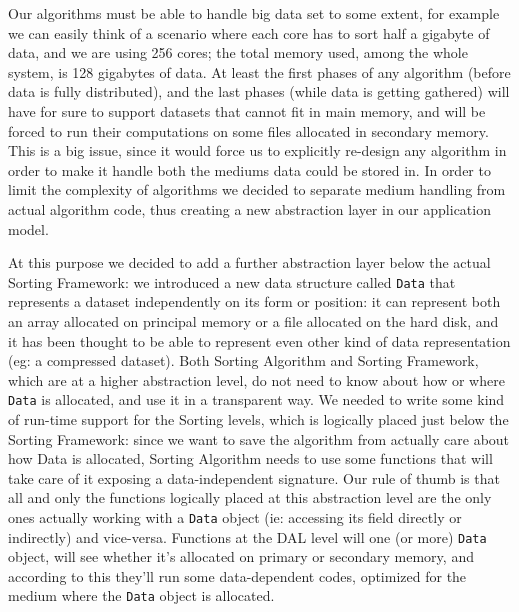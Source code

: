 \label{DAL}
Our algorithms must be able to handle big data set to some extent, for example we can easily think of a scenario where each core has to sort half a gigabyte of data, and we are using 256 cores; the total memory used, among the whole system, is 128 gigabytes of data.
At least the first phases of any algorithm (before data is fully distributed), and the last phases (while data is getting gathered) will have for sure to support datasets that cannot fit in main memory, and will be forced to run their computations on some files allocated in secondary memory.
This is a big issue, since it would force us to explicitly re-design any algorithm in order to make it handle both the mediums data could be stored in.
In order to limit the complexity of algorithms we decided to separate medium handling from actual algorithm code, thus creating a new abstraction layer in our application model.

At this purpose we decided to add a further abstraction layer below the actual Sorting Framework: we introduced a new data structure called \texttt{Data} that represents a dataset independently on its form or position: it can represent both an array allocated on principal memory or a file allocated on the hard disk, and it has been thought to be able to represent even other kind of data representation (eg: a compressed dataset). Both Sorting Algorithm and Sorting Framework, which are at a higher abstraction level, do not need to know about how or where \texttt{Data} is allocated, and use it in a transparent way.
We needed to write some kind of run-time support for the Sorting levels, which is logically placed just below the Sorting Framework: since we want to save the algorithm from actually care about how Data is allocated, Sorting Algorithm needs to use some functions that will take care of it exposing a data-independent signature. Our rule of thumb is that all and only the functions logically placed at this abstraction level are the only ones actually working with a \texttt{Data} object (ie: accessing its field directly or indirectly) and vice-versa.
Functions at the DAL level will one (or more) \texttt{Data} object, will see whether it's allocated on primary or secondary memory, and according to this they'll run some data-dependent codes, optimized for the medium where the \texttt{Data} object is allocated.

